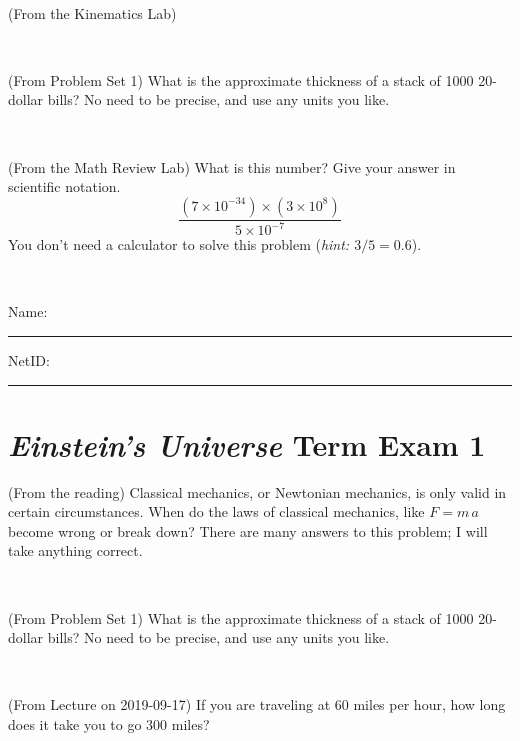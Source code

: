 \documentclass[12pt, letterpaper]{article}
\begin{document}
\vfill ~

\begin{problem} (From the Kinematics Lab)

\end{problem}


\vfill ~

\begin{problem} (From Problem Set 1)
What is the approximate thickness of a stack of 1000 20-dollar bills?
No need to be precise, and use any units you like.
\end{problem}


\vfill ~

\begin{problem} (From the Math Review Lab)
What is this number? Give your answer in scientific notation.
$$
\frac{(7\times10^{-34})\times(3\times10^8)}{5\times10^{-7}}
$$
You don't need a calculator to solve this problem (\textit{hint: $3/5=0.6$}).
\end{problem}


\vfill ~


\cleardoublepage



\noindent
Name: \rule[-1ex]{0.60\textwidth}{0.1pt}
NetID: \rule[-1ex]{0.20\textwidth}{0.1pt}

\section*{\textsl{Einstein's Universe} Term Exam 1}
\setcounter{problem}{1}


\begin{problem} (From the reading)
Classical mechanics, or Newtonian mechanics, is only valid in certain
circumstances. When do the laws of classical mechanics, like $F =
m\,a$ become wrong or break down? There are many answers to this
problem; I will take anything correct.
\end{problem}


\vfill ~

\begin{problem} (From Problem Set 1)
What is the approximate thickness of a stack of 1000 20-dollar bills?
No need to be precise, and use any units you like.
\end{problem}


\vfill ~

\begin{problem} (From Lecture on 2019-09-17)
If you are traveling at 60 miles per hour, how long does
it take you to go 300 miles?
\end{problem}
\end{document}
